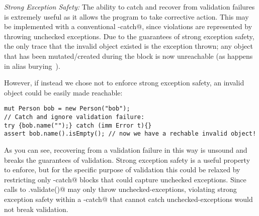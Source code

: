 %
%

\loseSpace
\noindent\textit{Strong Exception Safety:}
The ability to catch and recover from validation failures is extremely useful as it allows the program to take corrective action.
This may be implemented with a conventional \Q@try-catch@, since violations are represented by throwing unchecked exceptions. Due to the guarantees of strong exception safety, the only trace that the invalid object existed is the exception thrown; any object that has been mutated/created during the \Q@try@ block is now unreachable (as happens in alias burying~\cite{boyland2001alias}).

However, if instead we chose not to enforce strong exception safety, an invalid object could be easily made reachable:
\saveSpace
\begin{lstlisting}[morekeywords={assert}, escapechar=\%]
mut Person bob = new Person("bob");
// Catch and ignore validation failure:
try {bob.name("");} catch (imm Error t){}
assert bob.name().isEmpty(); // now we have a rechable invalid object!
\end{lstlisting}
\saveSpace
As you can see, recovering from a validation failure in this way is unsound and breaks the guarantees of validation.
Strong exception safety is a useful property to enforce, but for the specific purpose of validation this could be relaxed by restricting only \Q@try-catch@ blocks that could capture unchecked exceptions.
Since calls to \Q@.validate()@ may only throw unchecked-exceptions, violating strong exception safety within a \Q@try-catch@ that cannot catch unchecked-exceptions would not break validation.




